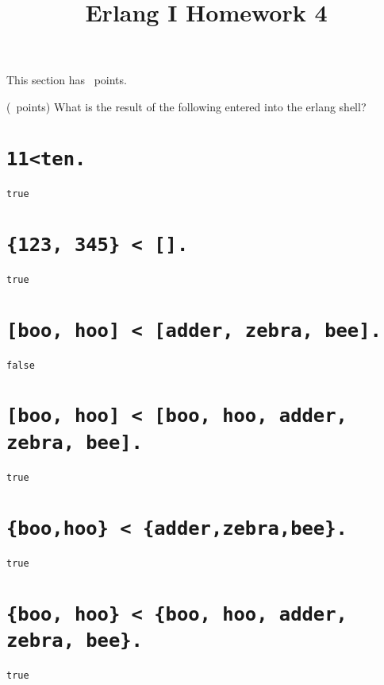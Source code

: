 



\printanswers

\title{Erlang I Homework 4}
\maketitle

This section has \numpoints\ points.

\begin{questions}
    \question (\totalpoints\ points) What is the result of the
    following entered into the erlang shell?
    \begin{parts} 
        \part[1]{\tt 11<ten.}  
        \begin{solution}
            {\tt true}
        \end{solution}
        \part[1] {\tt \{123, 345\} < [].}
        \begin{solution}
            {\tt true}
        \end{solution}
        \part[1] {\tt [boo, hoo] < [adder, zebra, bee]. }
        \begin{solution}
            {\tt false}
        \end{solution}
        \part[1] {\tt [boo, hoo] < [boo, hoo, adder, zebra, bee].}
        \begin{solution}
            {\tt true}
        \end{solution}
        \part[1] {\tt \{boo,hoo\} < \{adder,zebra,bee\}.}
        \begin{solution}
            {\tt true}
        \end{solution}
        \part[1] {\tt \{boo, hoo\} < \{boo, hoo, adder, zebra, bee\}.}
        \begin{solution}
            {\tt true}
        \end{solution}

\end{parts}
\end{questions}
